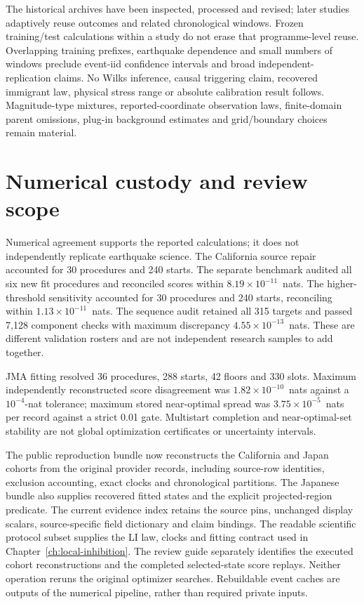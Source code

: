 The historical archives have been inspected, processed and revised; later studies adaptively reuse outcomes and related chronological windows. Frozen training/test calculations within a study do not erase that programme-level reuse. Overlapping training prefixes, earthquake dependence and small numbers of windows preclude event-iid confidence intervals and broad independent-replication claims. No Wilks inference, causal triggering claim, recovered immigrant law, physical stress range or absolute calibration result follows. Magnitude-type mixtures, reported-coordinate observation laws, finite-domain parent omissions, plug-in background estimates and grid/boundary choices remain material.


\section{Numerical custody and review scope}

Numerical agreement supports the reported calculations; it does not independently replicate earthquake science. The California source repair accounted for 30 procedures and 240 starts. The separate benchmark audited all six new fit procedures and reconciled scores within $8.19\times 10^{-11}$~nats. The higher-threshold sensitivity accounted for 30 procedures and 240 starts, reconciling within $1.13\times 10^{-11}$~nats. The sequence audit retained all 315 targets and passed 7,128 component checks with maximum discrepancy $4.55\times 10^{-13}$~nats. These are different validation rosters and are not independent research samples to add together.

JMA fitting resolved 36 procedures, 288 starts, 42 floors and 330 slots. Maximum independently reconstructed score disagreement was $1.82\times 10^{-10}$~nats against a $10^{-4}$-nat tolerance; maximum stored near-optimal spread was $3.75\times 10^{-5}$~nats per record against a strict 0.01 gate. Multistart completion and near-optimal-set stability are not global optimization certificates or uncertainty intervals.

The public reproduction bundle now reconstructs the California and Japan cohorts from the original provider records, including source-row identities, exclusion accounting, exact clocks and chronological partitions. The Japanese bundle also supplies recovered fitted states and the explicit projected-region predicate. The current evidence index retains the source pins, unchanged display scalars, source-specific field dictionary and claim bindings. The readable scientific protocol subset supplies the LI law, clocks and fitting contract used in Chapter~\ref{ch:local-inhibition}. The review guide separately identifies the executed cohort reconstructions and the completed selected-state score replays. Neither operation reruns the original optimizer searches. Rebuildable event caches are outputs of the numerical pipeline, rather than required private inputs.

